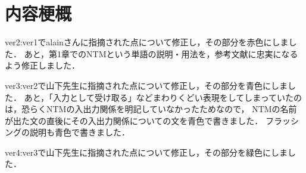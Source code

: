 \chapter*{内容梗概}
ver2:ver1でalainさんに指摘された点について修正し，その部分を赤色にしました．
あと，第1章でのNTMという単語の説明・用法を，参考文献に忠実になるよう修正しました．

ver3:ver2で山下先生に指摘された点について修正し，その部分を青色にしました．
あと，「入力として受け取る」などまわりくどい表現をしてしまっていたのは，恐らくNTMの入出力関係を明記していなかったためなので，
NTMの名前が出た文の直後にその入出力関係についての文を青色で書きました．
フラッシングの説明も青色で書きました．

ver4:ver3で山下先生に指摘された点について修正し，その部分を緑色にしました．
